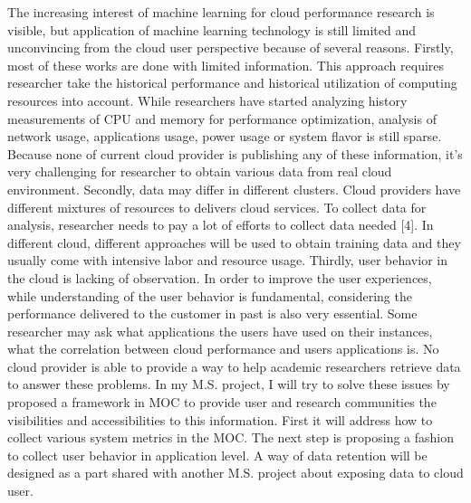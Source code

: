 The increasing interest of machine learning for cloud performance research is visible, but application of machine learning technology is still limited and unconvincing from the cloud user perspective because of several reasons. Firstly, most of these works are done with limited information. This approach requires researcher take the historical performance and historical utilization of computing resources into account. While researchers have started analyzing history measurements of CPU and memory for performance optimization, analysis of network usage, applications usage, power usage or system flavor is still sparse. Because none of current cloud provider is publishing any of these information, it’s very challenging for researcher to obtain various data from real cloud environment. Secondly, data may differ in different clusters. Cloud providers have different mixtures of resources to delivers cloud services. To collect data for analysis, researcher needs to pay a lot of efforts to collect data needed [4]. In different cloud, different approaches will be used to obtain training data and they usually come with intensive labor and resource usage. Thirdly, user behavior in the cloud is lacking of observation. In order to improve the user experiences, while understanding of the user behavior is fundamental, considering the performance delivered to the customer in past is also very essential. Some researcher may ask what applications the users have used on their instances, what the correlation between cloud performance and users applications is. No cloud provider is able to provide a way to help academic researchers retrieve data to answer these problems.
In my M.S. project, I will try to solve these issues by proposed a framework in MOC to provide user and research communities the visibilities and accessibilities to this information. First it will address how to collect various system metrics in the MOC. The next step is proposing a fashion to collect user behavior in application level. A way of data retention will be designed as a part shared with another M.S. project about exposing data to cloud user.
